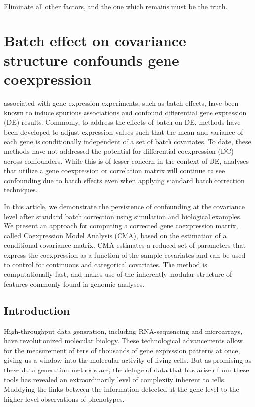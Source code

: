 \begin{savequote}[75mm]
Eliminate all other factors, and the one which remains must be the truth.
\end{savequote}

\chapter{Batch effect on covariance structure confounds gene coexpression}

 associated with gene expression experiments, such as batch effects, have been known to induce spurious associations and  confound differential gene expression (DE) results. Commonly, to address the effects of batch on DE, methods have been developed to adjust expression values such that the mean and variance of each gene is conditionally independent of a set of batch covariates. To date, these methods have not addressed the potential for differential coexpression (DC) across confounders. While this is of lesser concern in the context of DE, analyses that utilize a gene coexpression or correlation matrix will continue to see confounding due to batch effects even when applying standard batch correction techniques. 

In this article, we demonstrate the persistence of confounding at the covariance level after standard batch correction using simulation and biological examples. We present an approach for computing a corrected gene coexpression matrix, called Coexpression Model Analysis (CMA), based on the estimation of a conditional covariance matrix. CMA estimates a reduced set of parameters that express the coexpression as a function of the sample covariates and can be used to control for continuous and categorical covariates. The method is computationally fast, and makes use of the inherently modular structure of features commonly found in genomic analyses.

\section{Introduction}

High-throughput data generation, including RNA-sequencing and microarrays,
have revolutionized molecular biology. These technological advancements
allow for the measurement of tens of thousands of gene expression
patterns at once, giving us a window into the molecular activity of
living cells. But as promising as these data generation methods are,
the deluge of data that has arisen from these tools has revealed an
extraordinarily level of complexity inherent to cells.  Muddying the links between the information detected at the gene level to the higher level observations of phenotypes.

